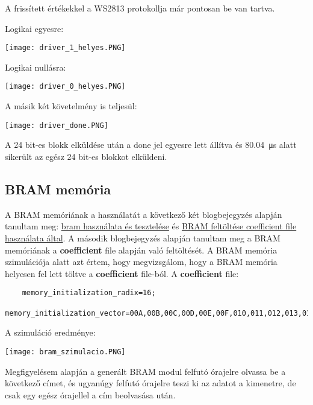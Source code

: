 A frissített értékekkel a WS2813 protokollja már pontosan be van tartva.

Logikai egyesre:

\texttt{[image: driver\_1\_helyes.PNG]}

Logikai nullásra:

\texttt{[image: driver\_0\_helyes.PNG]}

A másik két követelmény is teljesül:

\texttt{[image: driver\_done.PNG]}

A 24 bit-es blokk elküldése után a done jel egyesre lett állítva és \SI{80.04}{\micro\second} alatt sikerült az egész 24 bit-es blokkot elküldeni.


\subsection{BRAM memória}

A BRAM memóriának a használatát a következő két blogbejegyzés alapján tanultam meg: \href{http://vhdlguru.blogspot.com/2010/10/design-and-simulation-of-bram-using.html}{bram használata és tesztelése}
és \href{https://vhdlguru.blogspot.com/2010/10/how-to-use-coe-file-for-initializing.html}{BRAM feltöltése coefficient file használata által}.
A második blogbejegyzés alapján tanultam meg a BRAM memóriának a \textbf{coefficient} file alapján való feltöltését.
A BRAM memória szimulációja alatt azt értem, hogy megvizsgálom, hogy a BRAM memória helyesen fel lett töltve a \textbf{coefficient} file-ból.
A \textbf{coefficient} file:
\begin{verbatim}
	memory_initialization_radix=16;
	memory_initialization_vector=00A,00B,00C,00D,00E,00F,010,011,012,013,014,015,016,017,018,019;
\end{verbatim}

A szimuláció eredménye:

\texttt{[image: bram\_szimulacio.PNG]}

Megfigyelésem alapján a generált BRAM modul felfutó órajelre olvassa be a következő címet, és ugyanúgy felfutó órajelre teszi ki az adatot a kimenetre, de csak egy egész órajellel a cím beolvasása után.
